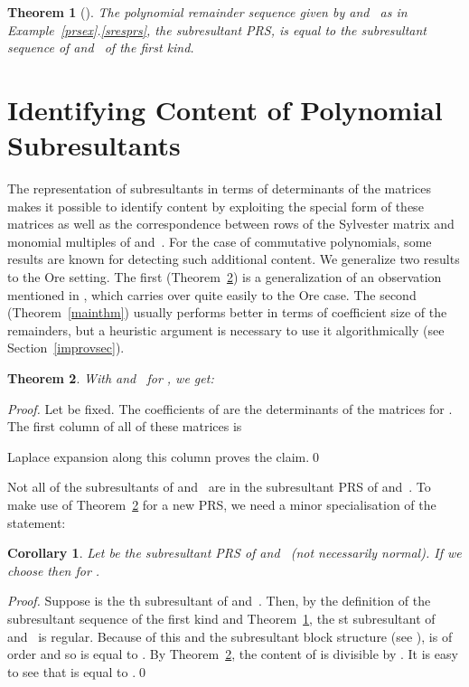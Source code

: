 \documentclass[3p,11pt,preprint]{elsarticle}
\newtheorem{theorem}{Theorem}
\newtheorem{corollary}{Corollary}
\begin{document}
\begin{theorem}[\cite{zli}]
\label{zlithm}
 The polynomial remainder sequence given by  and~ as in Example~\ref{prsex}.\ref{sresprs}, the subresultant PRS, is equal to the subresultant sequence of  and~ of the first kind.
\end{theorem}

\section{Identifying Content of Polynomial Subresultants}
\label{contentsec}

The representation of subresultants in terms of determinants of the matrices  makes it possible to identify content by exploiting the special form of these matrices as well as the correspondence between rows of the Sylvester matrix and monomial multiples of  and~. For the case of commutative polynomials, some results are known for detecting such additional content. We generalize two results to the Ore setting. The first (Theorem~\ref{simpleimprov}) is a generalization of an observation mentioned in \cite{brown}, which carries over quite easily to the Ore case. The second (Theorem~\ref{mainthm}) usually performs better in terms of coefficient size of the remainders, but a heuristic argument is necessary to use it algorithmically (see Section~\ref{improvsec}). 

\begin{theorem}
\label{simpleimprov}
 With  and~ for , we get: 
\end{theorem}
\begin{proof}
 Let  be fixed. The coefficients of  are the determinants of the matrices  for . The first column of all of these matrices is

Laplace expansion along this column proves the claim.\qed
\end{proof}

Not all of the subresultants of  and~ are in the subresultant PRS of  and~. To make use of Theorem~\ref{simpleimprov} for a new PRS, we need a minor specialisation of the statement:

\begin{corollary}
\label{cor1}
  Let  be the subresultant PRS of  and~ (not necessarily normal). If we choose  then  for .
\end{corollary}
\begin{proof}
 Suppose  is the th subresultant of  and~. Then, by the definition of the subresultant sequence of the first kind and Theorem~\ref{zlithm}, the st subresultant of  and~ is regular. Because of this and the subresultant block structure (see \cite{zli}),  is of order  and so  is equal to . By Theorem~\ref{simpleimprov}, the content of  is divisible by . 
 It is easy to see that  is equal to .\qed
\end{proof}
\end{document}
